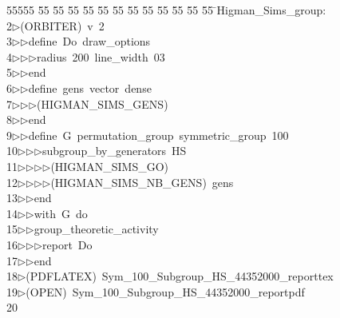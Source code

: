 %
%
\begin{tabbing}
55555 \= 55 \= 55 \= 55 \= 55 \= 55 \= 55 \= 55 \= 55 \= 55 \= 55 \= 55 \= 55 \= \>Higman\_Sims\_group:\\[0pt]
2\>$\triangleright$\>(ORBITER)\ v\ 2\ \\[0pt]
3\>$\triangleright$\>$\triangleright$\>define\ Do\ draw\_options\ \\[0pt]
4\>$\triangleright$\>$\triangleright$\>$\triangleright$\>radius\ 200\ line\_width\ 03\ \\[0pt]
5\>$\triangleright$\>$\triangleright$\>end\ \\[0pt]
6\>$\triangleright$\>$\triangleright$\>define\ gens\ vector\ dense\ \\[0pt]
7\>$\triangleright$\>$\triangleright$\>$\triangleright$\>(HIGMAN\_SIMS\_GENS)\ \\[0pt]
8\>$\triangleright$\>$\triangleright$\>end\ \\[0pt]
9\>$\triangleright$\>$\triangleright$\>define\ G\ permutation\_group\ symmetric\_group\ 100\ \\[0pt]
10\>$\triangleright$\>$\triangleright$\>$\triangleright$\>subgroup\_by\_generators\ HS\ \\[0pt]
11\>$\triangleright$\>$\triangleright$\>$\triangleright$\>$\triangleright$\>(HIGMAN\_SIMS\_GO)\ \\[0pt]
12\>$\triangleright$\>$\triangleright$\>$\triangleright$\>$\triangleright$\>(HIGMAN\_SIMS\_NB\_GENS)\ gens\ \\[0pt]
13\>$\triangleright$\>$\triangleright$\>end\ \\[0pt]
14\>$\triangleright$\>$\triangleright$\>with\ G\ do\ \\[0pt]
15\>$\triangleright$\>$\triangleright$\>group\_theoretic\_activity\ \\[0pt]
16\>$\triangleright$\>$\triangleright$\>$\triangleright$\>report\ Do\ \\[0pt]
17\>$\triangleright$\>$\triangleright$\>end\\[0pt]
18\>$\triangleright$\>(PDFLATEX)\ Sym\_100\_Subgroup\_HS\_44352000\_reporttex\\[0pt]
19\>$\triangleright$\>(OPEN)\ Sym\_100\_Subgroup\_HS\_44352000\_reportpdf\\[0pt]
20\>\end{tabbing}

